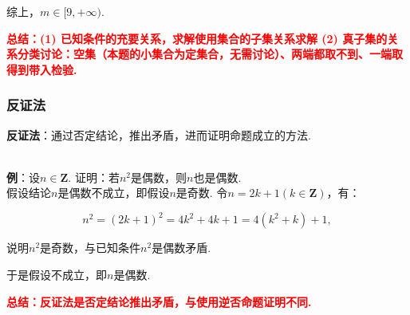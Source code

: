 \documentclass[8pt]{article}
\begin{document}
				综上，$m\in[9, +\infty).$

				\textcolor{red}{\textbf{总结：(1) 已知条件的充要关系，求解使用集合的子集关系求解 (2) 真子集的关系分类讨论：空集（本题的小集合为定集合，无需讨论）、两端都取不到、一端取得到带入检验.}}

			\subsubsection{反证法}

				\textbf{反证法}：通过否定结论，推出矛盾，进而证明命题成立的方法.

				~\\

				\textbf{例}：设$n\in\mathbf{Z}.$ 证明：若$n^2$是偶数，则$n$也是偶数.
				~\\

				假设结论$n$是偶数不成立，即假设$n$是奇数. 令$n=2k+1 (k\in\mathbf{Z})$，有：

				$$n^2=(2k+1)^2=4k^2+4k+1=4(k^2+k)+1,$$

				说明$n^2$是奇数，与已知条件$n^2$是偶数矛盾.

				于是假设不成立，即$n$是偶数.

				\textcolor{red}{\textbf{总结：反证法是否定结论推出矛盾，与使用逆否命题证明不同.}}
\end{document}
